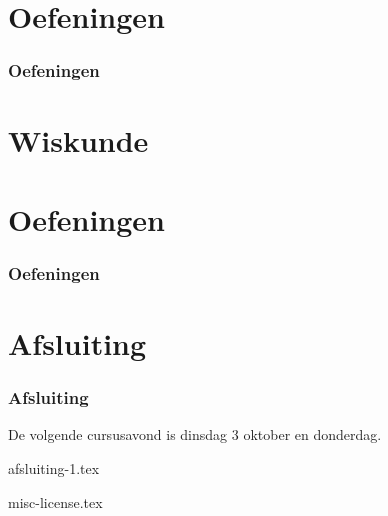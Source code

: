 \documentclass[allauthors,dutch,
defaultSlideCollection=tim]{../../cursuspresentatie}
\begin{document}






\section{Oefeningen}
\def\placetarget{\hypertarget{oefeningen2}{}}

\begin{frame}
	\frametitle{Oefeningen}
	
	\centering
\end{frame}



\section{Wiskunde}
\def\placetarget{\hypertarget{wiskunde}{}}










\section{Oefeningen}
\def\placetarget{\hypertarget{oefeningen3}{}}

\begin{frame}
	\frametitle{Oefeningen}
	
	\centering
\end{frame}

\section{Afsluiting}
\def\placetarget{\hypertarget{afsluiting}{}}

\begin{frame}
	\frametitle{Afsluiting}
	
	De volgende cursusavond is dinsdag 3 oktober en donderdag.
\end{frame}
{afsluiting-1.tex}
	
{misc-license.tex}
\end{document}
